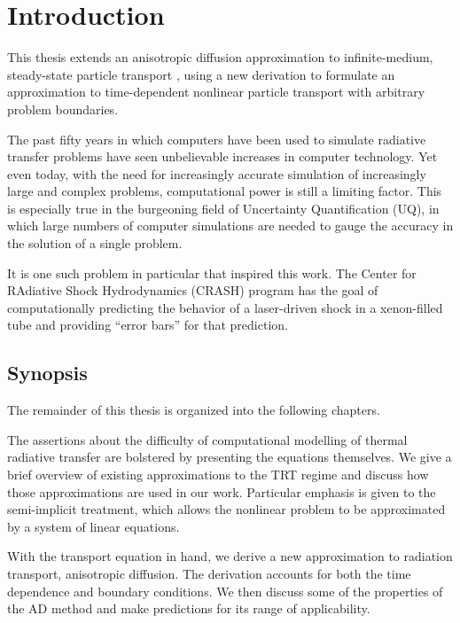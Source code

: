 
\chapter{Introduction}\label{chap:introduction}
This thesis extends an anisotropic diffusion approximation to infinite-medium,
steady-state particle transport \cite{Mor2007,Lar2009c}, using a new derivation
to formulate an approximation to time-dependent nonlinear particle transport
with arbitrary problem boundaries.

The past fifty years in which computers have been used to simulate radiative
transfer problems \cite{Cam1964,Cam1969} have seen unbelievable
increases in computer technology.
Yet even today, with the need for increasingly accurate simulation of increasingly
large and complex problems, computational power is still a limiting factor.
This is especially true in the burgeoning field of Uncertainty Quantification
(UQ), in which large numbers of computer simulations are needed to gauge the
accuracy in the solution of a single problem.

It is one such problem in particular that inspired this work. The Center for
RAdiative Shock Hydrodynamics (CRASH) program \cite{Crash2010} has the goal of
computationally predicting the behavior of a laser-driven shock in a
xenon-filled tube and providing ``error bars'' for that prediction. 

\section{Synopsis}
The remainder of this thesis is organized into the following chapters.

The assertions about the difficulty of computational modelling of thermal
radiative transfer are bolstered by presenting the equations themselves. We give
a brief overview of existing approximations to the TRT regime and discuss how
those approximations are used in our work. Particular emphasis is given to the
semi-implicit treatment, which allows the nonlinear problem to be approximated
by a system of linear equations.

With the transport equation in hand, we derive a new approximation to radiation
transport, anisotropic diffusion. The derivation accounts for both the time
dependence and boundary conditions. We then discuss some of the properties of
the AD method and make predictions for its range of applicability.

